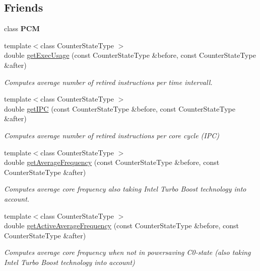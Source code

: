 \subsection*{Friends}
\begin{DoxyCompactItemize}
\item 
\mbox{\label{class_basic_counter_state_ab5f56d2e95ba3daf52c17b8a1d356d64}} 
class {\bfseries P\+CM}
\item 
{\footnotesize template$<$class Counter\+State\+Type $>$ }\\double \mbox{\hyperlink{class_basic_counter_state_a159a6896f5ef3626b88cdd27a3c15ac0}{get\+Exec\+Usage}} (const Counter\+State\+Type \&before, const Counter\+State\+Type \&after)
\begin{DoxyCompactList}\small\item\em Computes average number of retired instructions per time intervall. \end{DoxyCompactList}\item 
{\footnotesize template$<$class Counter\+State\+Type $>$ }\\double \mbox{\hyperlink{class_basic_counter_state_a7b0019d24a77dc05b7e47cb98192fd22}{get\+I\+PC}} (const Counter\+State\+Type \&before, const Counter\+State\+Type \&after)
\begin{DoxyCompactList}\small\item\em Computes average number of retired instructions per core cycle (I\+PC) \end{DoxyCompactList}\item 
{\footnotesize template$<$class Counter\+State\+Type $>$ }\\double \mbox{\hyperlink{class_basic_counter_state_aa398facfd523b7dcdbf827a74970a88c}{get\+Average\+Frequency}} (const Counter\+State\+Type \&before, const Counter\+State\+Type \&after)
\begin{DoxyCompactList}\small\item\em Computes average core frequency also taking Intel Turbo Boost technology into account. \end{DoxyCompactList}\item 
{\footnotesize template$<$class Counter\+State\+Type $>$ }\\double \mbox{\hyperlink{class_basic_counter_state_a963d78be64ccddb4f7686405ef4df9c1}{get\+Active\+Average\+Frequency}} (const Counter\+State\+Type \&before, const Counter\+State\+Type \&after)
\begin{DoxyCompactList}\small\item\em Computes average core frequency when not in powersaving C0-\/state (also taking Intel Turbo Boost technology into account) \end{DoxyCompactList}\item 

\end{DoxyCompactItemize}
